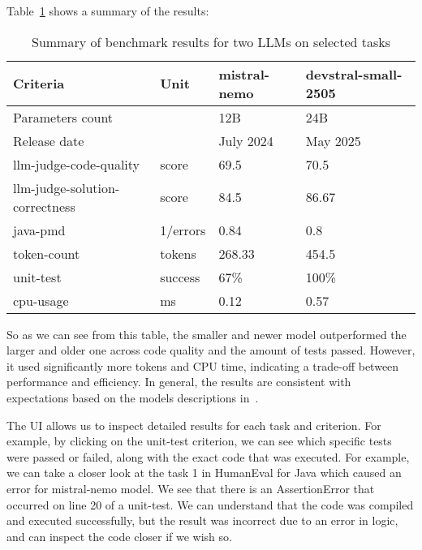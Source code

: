Table~\ref{tab:benchmark-results-summary} shows a summary of the results:
\begin{table}[H]
    \centering
    \begin{tabular}{|l|l|l|l|}
        \hline
        \textbf{Criteria}	& \textbf{Unit} & \textbf{mistral-nemo}	& \textbf{devstral-small-2505} \\
        \hline
        Parameters count    &               & 12B                   & 24B \\
        Release date        &               & July 2024             & May 2025 \\
        \hline
        llm-judge-code-quality & score & 69.5 & 70.5 \\
        llm-judge-solution-correctness & score & 84.5 & 86.67 \\
        java-pmd & 1/errors & 0.84 & 0.8 \\
        token-count & tokens & 268.33 & 454.5 \\
        unit-test & success & 67\% & 100\% \\
        cpu-usage & ms & 0.12 & 0.57 \\
        \hline
    \end{tabular}
    \caption{Summary of benchmark results for two LLMs on selected tasks}
    \label{tab:benchmark-results-summary}
\end{table}
So as we can see from this table, the smaller and newer model outperformed the larger and older one across code quality and the amount of tests passed.
However, it used significantly more tokens and CPU time, indicating a trade-off between performance and efficiency.
In general, the results are consistent with expectations based on the models descriptions in~\cite{mistralModelsBenchmarks}.

The UI allows us to inspect detailed results for each task and criterion.
For example, by clicking on the unit-test criterion, we can see which specific tests were passed or failed, along with the exact code that was executed.
For example, we can take a closer look at the task 1 in HumanEval for Java which caused an error for mistral-nemo model.
We see that there is an AssertionError that occurred on line 20 of a unit-test.
We can understand that the code was compiled and executed successfully, but the result was incorrect due to an error in logic, and can inspect the code closer if we wish so.

